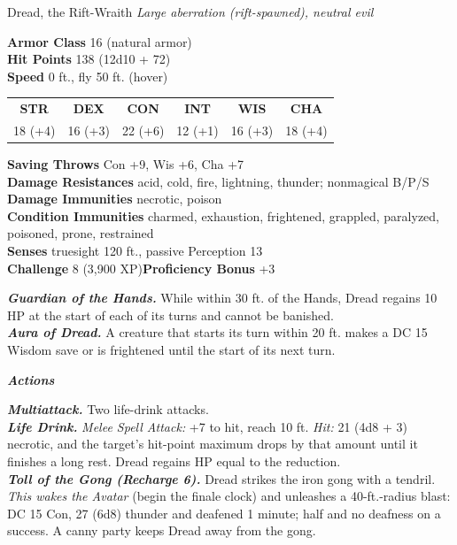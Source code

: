 \documentclass[10pt,twoside]{article}
\newcommand{\abilities}[6]{%
\begin{center}\small
\setlength{\tabcolsep}{6pt}\renewcommand{\arraystretch}{1.05}
\begin{tabular}{cccccc}
\textbf{STR}&\textbf{DEX}&\textbf{CON}&\textbf{INT}&\textbf{WIS}&\textbf{CHA}\\[1pt]
#1&#2&#3&#4&#5&#6\\
\end{tabular}\end{center}}
\newcommand{\sbrule}{\par\vspace{2pt}\noindent{\color{bloodred}\rule{\linewidth}{1.1pt}}\par\vspace{2pt}}
\begin{document}
\begin{statblock}{Dread, the Rift-Wraith}
\textit{Large aberration (rift-spawned), neutral evil}\sbrule
\textbf{Armor Class} 16 (natural armor)\\
\textbf{Hit Points} 138 (12d10 + 72)\\
\textbf{Speed} 0 ft., fly 50 ft. (hover)\sbrule
\abilities{18 (+4)}{16 (+3)}{22 (+6)}{12 (+1)}{16 (+3)}{18 (+4)}
\sbrule
\textbf{Saving Throws} Con +9, Wis +6, Cha +7\\
\textbf{Damage Resistances} acid, cold, fire, lightning, thunder; nonmagical B/P/S\\
\textbf{Damage Immunities} necrotic, poison\\
\textbf{Condition Immunities} charmed, exhaustion, frightened, grappled, paralyzed,
poisoned, prone, restrained\\
\textbf{Senses} truesight 120 ft., passive Perception 13\\
\textbf{Challenge} 8 (3,900 XP)\hfill\textbf{Proficiency Bonus} +3\sbrule
\textbf{\textit{Guardian of the Hands.}} While within 30 ft. of the Hands, Dread
regains 10 HP at the start of each of its turns and cannot be banished.\\
\textbf{\textit{Aura of Dread.}} A creature that starts its turn within 20 ft. makes a
DC 15 Wisdom save or is frightened until the start of its next turn.\sbrule
\textit{\textbf{Actions}}\par
\textbf{\textit{Multiattack.}} Two life-drink attacks.\\
\textbf{\textit{Life Drink.}} \textit{Melee Spell Attack:} +7 to hit, reach 10 ft.
\textit{Hit:} 21 (4d8 + 3) necrotic, and the target's hit-point maximum drops by that
amount until it finishes a long rest. Dread regains HP equal to the reduction.\\
\textbf{\textit{Toll of the Gong (Recharge 6).}} Dread strikes the iron gong with a
tendril. \emph{This wakes the Avatar} (begin the finale clock) and unleashes a
40-ft.-radius blast: DC 15 Con, 27 (6d8) thunder and deafened 1 minute; half and no
deafness on a success. A canny party keeps Dread away from the gong.
\end{statblock}
\end{document}
